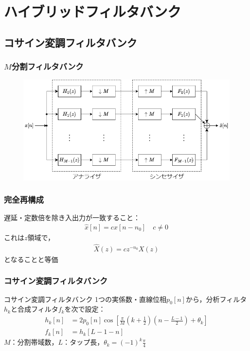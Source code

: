 \documentclass[14pt,xcolor=dvipsnames,table,dvipdfmx]{beamer}
\begin{document}
\section{ハイブリッドフィルタバンク}

\subsection{コサイン変調フィルタバンク}

\begin{frame}[c]
    \frametitle{$M$分割フィルタバンク}
    \begin{figure}
        \includegraphics[width=120mm]{./figs/filter_bank.drawio.png}
    \end{figure}
\end{frame}

\begin{frame}[c]
    \frametitle{完全再構成}
    遅延・定数倍を除き入出力が一致すること：
    \begin{align}
        \hat{x}[n] = c x[n - n_{0}] \quad c \neq 0
    \end{align}
    これは$z$領域で，
    \begin{align}
        \hat{X}(z) = c z^{-n_{0}} X(z)
    \end{align}
    となることと等価
\end{frame}

\begin{frame}[c]
    \frametitle{コサイン変調フィルタバンク}
    \begin{block}{コサイン変調フィルタバンク}
        1つの実係数・直線位相$p_{0}[n]$から，分析フィルタ$h_{k}$と合成フィルタ$f_{k}$を次で設定：
        \begin{align}
            h_{k}[n] &= 2 p_{0}[n] \cos \left[ \frac{\pi}{M} \left( k + \frac{1}{2} \right) \left( n - \frac{L - 1}{2} \right) + \theta_{k} \right] \label{eq:cos_modulated_analysis_filter} \\
            f_{k}[n] &= h_{k}[L - 1 - n] \label{eq:cos_modulated_synthesis_filter}
        \end{align}
        $M$：分割帯域数，$L$：タップ長，$\theta_{k} = (-1)^{k} \frac{\pi}{4}$
    \end{block}
\end{frame}
\end{document}
